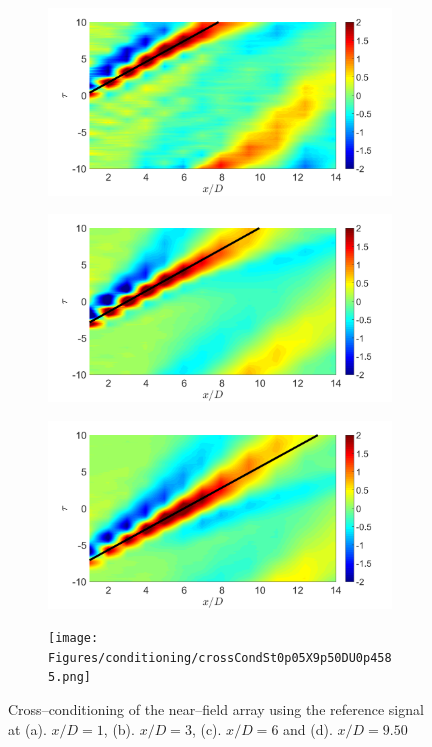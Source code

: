 \begin{figure}
	\centering
	\begin{subfigure}{.5\textwidth}
		\centering
		\includegraphics[width=0.45\linewidth]{Figures/conditioning/crossCondSt0p05X1DU0p7060.png}
		\caption{}
		\label{fig:ch3_farfield_phavg}
	\end{subfigure}%
	\begin{subfigure}{.5\textwidth}
		\centering
		\includegraphics[width=0.45\linewidth]{Figures/conditioning/crossCondSt0p05X3DU0p6962.png}
		\caption{}
		\label{fig:ch3_farfield_phavg}
	\end{subfigure}%
	\begin{subfigure}{.5\textwidth}
		\centering
		\includegraphics[width=0.45\linewidth]{Figures/conditioning/crossCondSt0p05X6DU0p7054.png}
		\caption{}
		\label{fig:ch3_farfield_phavg}
	\end{subfigure}%
	\begin{subfigure}{.5\textwidth}
		\centering
		\texttt{[image: Figures/conditioning/crossCondSt0p05X9p50DU0p4585.png]}
		\caption{}
		\label{fig:ch3_farfield_phavg}
	\end{subfigure}%
	\caption{Cross--conditioning of the near--field array using the reference signal at (a). $x/D = 1$, (b). $x/D=3$, (c). $x/D=6$ and (d). $x/D=9.50$}
	\label{fig:crossCondSt0p15}
\end{figure}
